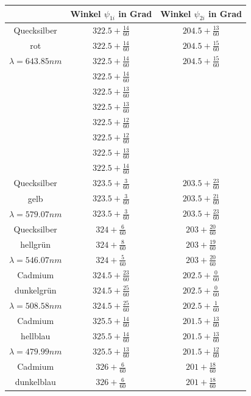 \documentclass[12pt,a4paper]{article}
\begin{document}
\begin{table}
	\centering
	\begin{tabular}{|c|c|c|}
		\hline
		 & Winkel $\psi_{1i}$ in Grad & Winkel $\psi_{2i}$ in Grad\\
		\hline
		Quecksilber&$322.5+\frac{14}{60}$&$204.5+\frac{13}{60}$\\[0.1cm]
		rot&$322.5+\frac{14}{60}$&$204.5+\frac{15}{60}$\\[0.1cm]
		$\lambda=643.85nm$&$322.5+\frac{14}{60}$&$204.5+\frac{15}{60}$\\[0.1cm]
		&$322.5+\frac{14}{60}$&\\[0.1cm]
		&$322.5+\frac{13}{60}$&\\[0.1cm]
		&$322.5+\frac{13}{60}$&\\[0.1cm]
		&$322.5+\frac{12}{60}$&\\[0.1cm]
		&$322.5+\frac{12}{60}$&\\[0.1cm]
		&$322.5+\frac{13}{60}$&\\[0.1cm]
		&$322.5+\frac{14}{60}$&\\[0.1cm]
		\hline
		Quecksilber&$323.5+\frac{3}{60}$&$203.5+\frac{23}{60}$\\[0.1cm]
		gelb&$323.5+\frac{3}{60}$&$203.5+\frac{21}{60}$\\[0.1cm]
		$\lambda=579.07nm$&$323.5+\frac{3}{60}$&$203.5+\frac{23}{60}$\\[0.1cm]
		\hline
		Quecksilber&$324+\frac{6}{60}$&$203+\frac{20}{60}$\\[0.1cm]
		hellgrün&$324+\frac{8}{60}$&$203+\frac{19}{60}$\\[0.1cm]
		$\lambda=546.07nm$&$324+\frac{5}{60}$&$203+\frac{20}{60}$\\[0.1cm]
		\hline
		Cadmium&$324.5+\frac{23}{60}$&$202.5+\frac{0}{60}$\\[0.1cm]
		dunkelgrün&$324.5+\frac{25}{60}$&$202.5+\frac{0}{60}$\\[0.1cm]
		$\lambda=508.58nm$&$324.5+\frac{25}{60}$&$202.5+\frac{1}{60}$\\[0.1cm]
		\hline
		Cadmium&$325.5+\frac{14}{60}$&$201.5+\frac{13}{60}$\\[0.1cm]
		hellblau&$325.5+\frac{14}{60}$&$201.5+\frac{13}{60}$\\[0.1cm]
		$\lambda=479.99nm$&$325.5+\frac{13}{60}$&$201.5+\frac{12}{60}$\\[0.1cm]
		\hline
		Cadmium&$326+\frac{6}{60}$&$201+\frac{18}{60}$\\[0.1cm]
		dunkelblau&$326+\frac{6}{60}$&$201+\frac{18}{60}$\\[0.1cm]

\end{tabular}
\end{table}
\end{document}
